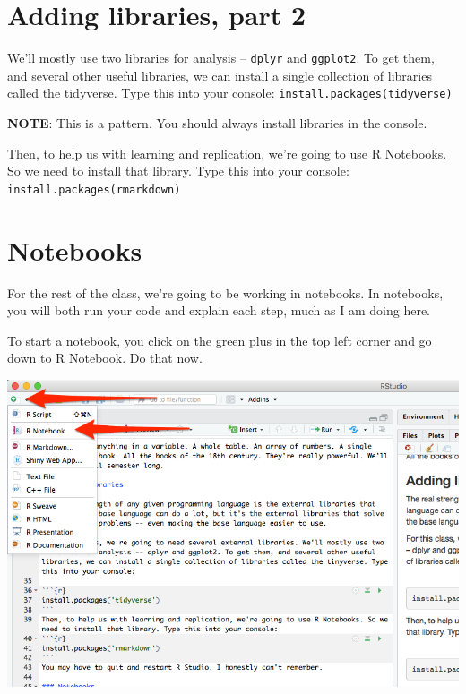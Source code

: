 \documentclass[]{book}
\begin{document}
\hypertarget{adding-libraries-part-2}{%
\section{Adding libraries, part 2}\label{adding-libraries-part-2}}

We'll mostly use two libraries for analysis -- \texttt{dplyr} and \texttt{ggplot2}. To get them, and several other useful libraries, we can install a single collection of libraries called the tidyverse. Type this into your console: \texttt{install.packages(\textquotesingle{}tidyverse\textquotesingle{})}

\textbf{NOTE}: This is a pattern. You should always install libraries in the console.

Then, to help us with learning and replication, we're going to use R Notebooks. So we need to install that library. Type this into your console: \texttt{install.packages(\textquotesingle{}rmarkdown\textquotesingle{})}

\hypertarget{notebooks}{%
\section{Notebooks}\label{notebooks}}

For the rest of the class, we're going to be working in notebooks. In notebooks, you will both run your code and explain each step, much as I am doing here.

To start a notebook, you click on the green plus in the top left corner and go down to R Notebook. Do that now.

\includegraphics[width=11.08in]{images/verybasics2}
\end{document}
